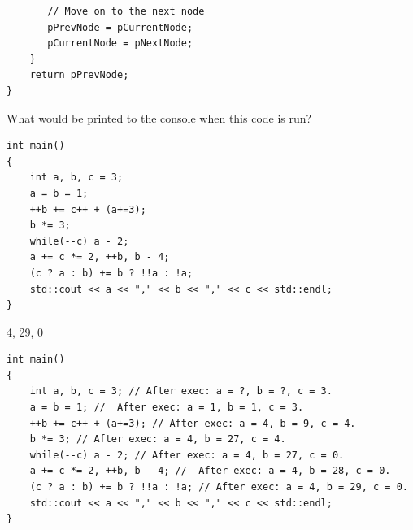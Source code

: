 \documentclass[answers]{exam}
\begin{document}
\begin{questions}
\begin{solution}[.2in]
\begin{lstlisting}
       // Move on to the next node
       pPrevNode = pCurrentNode;
       pCurrentNode = pNextNode;
    }
    return pPrevNode;
}
\end{lstlisting}
\end{solution}

\question What would be printed to the console when this code is run?
\begin{lstlisting}
int main()
{
    int a, b, c = 3;
    a = b = 1;
    ++b += c++ + (a+=3);
    b *= 3;
    while(--c) a - 2;
    a += c *= 2, ++b, b - 4;
    (c ? a : b) += b ? !!a : !a;
    std::cout << a << "," << b << "," << c << std::endl;
}
\end{lstlisting}
\begin{solution}[.2in]
4, 29, 0
\begin{lstlisting}
int main()
{
    int a, b, c = 3; // After exec: a = ?, b = ?, c = 3.
    a = b = 1; //  After exec: a = 1, b = 1, c = 3.
    ++b += c++ + (a+=3); // After exec: a = 4, b = 9, c = 4.
    b *= 3; // After exec: a = 4, b = 27, c = 4.
    while(--c) a - 2; // After exec: a = 4, b = 27, c = 0.
    a += c *= 2, ++b, b - 4; //  After exec: a = 4, b = 28, c = 0.
    (c ? a : b) += b ? !!a : !a; // After exec: a = 4, b = 29, c = 0.
    std::cout << a << "," << b << "," << c << std::endl;
}
\end{lstlisting}
\end{solution}

\end{questions}

\newpage
\end{document}

